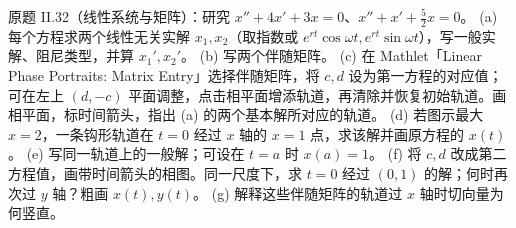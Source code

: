 \begin{solution}
\begin{center}
\end{center}
\end{solution}
\begin{exercise}\label{cw:ps8-II-32}原题 II.32（线性系统与矩阵）：研究 $x''+4x'+3x=0$、$x''+x'+\tfrac52x=0$。
(a) 每个方程求两个线性无关实解 $x_1,x_2$（取指数或 $e^{rt}\cos\omega t,e^{rt}\sin\omega t$），写一般实解、阻尼类型，并算 $x_1',x_2'$。
(b) 写两个伴随矩阵。
(c) 在 Mathlet「Linear Phase Portraits: Matrix Entry」选择伴随矩阵，将 $c,d$ 设为第一方程的对应值；可在左上 $(d,-c)$ 平面调整，点击相平面增添轨道，再清除并恢复初始轨道。画相平面，标时间箭头，指出 (a) 的两个基本解所对应的轨道。
(d) 若图示最大 $x=2$，一条钩形轨道在 $t=0$ 经过 $x$ 轴的 $x=1$ 点，求该解并画原方程的 $x(t)$。
(e) 写同一轨道上的一般解；可设在 $t=a$ 时 $x(a)=1$。
(f) 将 $c,d$ 改成第二方程值，画带时间箭头的相图。同一尺度下，求 $t=0$ 经过 $(0,1)$ 的解；何时再次过 $y$ 轴？粗画 $x(t),y(t)$。
(g) 解释这些伴随矩阵的轨道过 $x$ 轴时切向量为何竖直。\end{exercise}
